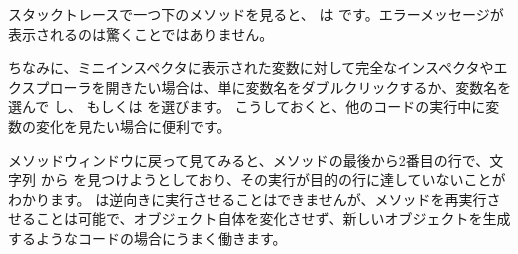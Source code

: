 \documentclass[a4paper,10pt,twoside]{book}
\begin{document}
スタックトレースで一つ下のメソッドを見ると、 は  です。エラーメッセージが表示されるのは驚くことではありません。

ちなみに、ミニインスペクタに表示された変数に対して完全なインスペクタやエクスプローラを開きたい場合は、単に変数名をダブルクリックするか、変数名を選んで \actclick し、 もしくは  を選びます。
こうしておくと、他のコードの実行中に変数の変化を見たい場合に便利です。

メソッドウィンドウに戻って見てみると、メソッドの最後から2番目の行で、文字列  から  を見つけようとしており、その実行が目的の行に達していないことがわかります。
\pharo は逆向きに実行させることはできませんが、メソッドを再実行させることは可能で、オブジェクト自体を変化させず、新しいオブジェクトを生成するようなコードの場合にうまく働きます。

\end{document}
